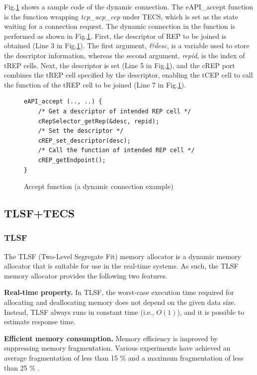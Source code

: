 \documentclass[JIP]{ipsj_v2/UTF8/ipsj}
\begin{document}
Fig.\ref{src:DynamicCcode} shows a sample code of the dynamic connection.
The eAPI\_accept function is the function wrapping {\it tcp\_acp\_cep} under TECS, which is set as the state waiting for a connection request.
The dynamic connection in the function is performed as shown in Fig.\ref{src:DynamicCcode}.
First, the descriptor of REP to be joined is obtained (Line 3 in Fig.\ref{src:DynamicCcode}).
The first argument, {\it \&desc}, is a variable used to store the descriptor information, whereas the second argument, {\it repid}, is the index of tREP cells.
Next, the descriptor is set (Line 5 in Fig.\ref{src:DynamicCcode}), and the cREP port combines the tREP cell specified by the descriptor, enabling the tCEP cell to call the function of the tREP cell to be joined (Line 7 in Fig.\ref{src:DynamicCcode}).

\begin{figure}[t]
\centering
\begin{lstlisting}
eAPI_accept (.., ..) {
    /* Get a descriptor of intended REP cell */
    cRepSelector_getRep(&desc, repid);
    /* Set the descriptor */
    cREP_set_descriptor(desc);
    /* Call the function of intended REP cell */
    cREP_getEndpoint();
}
\end{lstlisting}
\caption{Accept function (a dynamic connection example)}
\label{src:DynamicCcode}
\end{figure}


\subsection{TLSF+TECS}
\label{sec:TLSF+TECS}

\subsubsection{TLSF}

The TLSF (Two-Level Segregate Fit) memory allocator\cite{par:TLSF}\cite{url:TLSF} is a dynamic memory allocator that is suitable for use in the real-time systems.
As such, the TLSF memory allocator provides the following two features.

{\bf Real-time property.}
In TLSF, the worst-case execution time required for allocating and deallocating memory does not depend on the given data size.
Instead, TLSF always runs in constant time (i.e., $O(1)$), and it is possible to estimate response time.

{\bf Efficient memory consumption.}
Memory efficiency is improved by suppressing memory fragmentation.
Various experiments have achieved an average fragmentation of less than 15 \% and a maximum fragmentation of less than 25 \% \cite{url:TLSF}.
\end{document}
